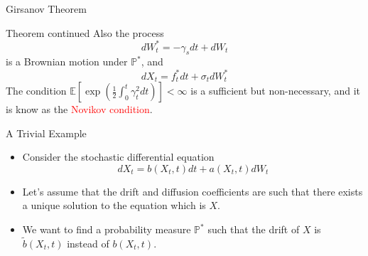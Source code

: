 \documentclass{beamer}
\begin{document}
\begin{frame}{Girsanov Theorem}
  \begin{block}{Theorem continued}
    Also the process
    \begin{equation}
      dW^*_t = -\gamma_s dt + dW_t
    \end{equation} 
    is a Brownian motion under $\mathbb{P}^*$, and 
    \begin{equation*}
      dX_t = f^*_t dt + \sigma_t dW^*_t
    \end{equation*}
    The condition $\mathbb{E}\left[\exp\left(\frac{1}{2}\int_0^t\gamma_t^2dt\right)\right]<\infty$ is a sufficient but non-necessary, and it is know as the \textcolor{red}{Novikov condition}.
  \end{block}
\end{frame}


\begin{frame}{A Trivial Example}
  \begin{itemize}
  \item Consider the stochastic differential equation
    \begin{equation*}
      dX_t = b(X_t, t) dt + a(X_t, t) dW_t
    \end{equation*}
  \item Let's assume that the drift and diffusion coefficients are such that there exists a unique solution to the equation which is $X$.
  \item We want to find a probability measure $\mathbb{P}^*$ such that the drift of $X$ is $\tilde{b}(X_t,t)$ instead of $b(X_t,t)$.
  \end{itemize}
\end{frame}
\end{document}
